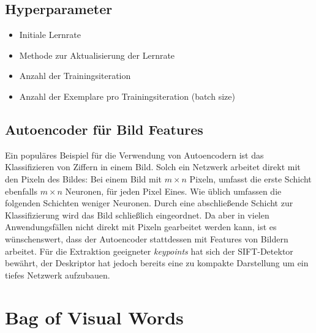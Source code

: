 \subsection{Hyperparameter}
 \cite{pda2012}

\begin{itemize}
	\item Initiale Lernrate
	\item Methode zur Aktualisierung der Lernrate
	\item Anzahl der Trainingsiteration
	\item Anzahl der Exemplare pro Trainingsiteration (batch size) 
\end{itemize}

\subsection{Autoencoder für Bild Features}
\label{AEFeatures}

Ein populäres Beispiel für die Verwendung von Autoencodern ist das Klassifizieren von Ziffern in einem Bild. Solch ein Netzwerk arbeitet direkt mit den Pixeln des Bildes: Bei einem Bild mit $m \times n$ Pixeln, umfasst die erste Schicht ebenfalls $m \times n$ Neuronen, für jeden Pixel Eines. Wie üblich umfassen die folgenden Schichten weniger Neuronen. Durch eine abschließende Schicht zur Klassifizierung wird das Bild schließlich eingeordnet. Da aber in vielen Anwendungsfällen nicht direkt mit Pixeln gearbeitet werden kann, ist es wünschenswert, dass der Autoencoder stattdessen mit Features von Bildern arbeitet. Für die Extraktion geeigneter \textit{keypoints} hat sich der SIFT-Detektor bewährt, der Deskriptor hat jedoch bereits eine zu kompakte Darstellung um ein tiefes Netzwerk aufzubauen. 

\section{Bag of Visual Words}


